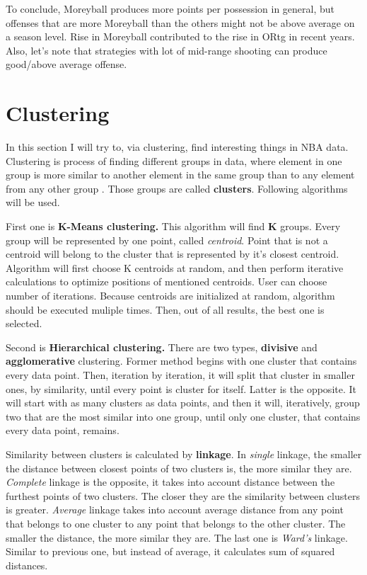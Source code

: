 \documentclass[a4paper]{article}
\begin{document}
To conclude, Moreyball produces more points per possession in general, but offenses that are more Moreyball than the others might not be above average on a season level. Rise in Moreyball contributed to the rise in ORtg in recent years. Also, let's note that strategies with lot of mid-range shooting can produce good/above average offense. %


\section{Clustering}
\label{sec:clustering}

In this section I will try to, via clustering, find interesting things in NBA data. Clustering is process of finding different groups in data, where element in one group is more similar to another element in the same group than to any element from any other group \cite{clustering}. Those groups are called \textbf{clusters}. Following algorithms will be used.

First one is \textbf{K-Means clustering.} This algorithm will find \textbf{K} groups. Every group will be represented by one point, called \textit{centroid}. Point that is not a centroid will belong to the cluster that is represented by it's closest centroid. Algorithm will first choose K centroids at random, and then perform iterative calculations to optimize positions of mentioned centroids. User can choose number of iterations. Because centroids are initialized at random, algorithm should be executed muliple times. Then, out of all results, the best one is selected. \cite{clustering}

Second is \textbf{Hierarchical clustering.} There are two types, \textbf{divisive} and \textbf{agglomerative} clustering. Former method begins with one cluster that contains every data point. Then, iteration by iteration, it will split that cluster in smaller ones, by similarity, until every point is cluster for itself. Latter is the opposite. It will start with as many clusters as data points, and then it will, iteratively, group two that are the most similar into one group, until only one cluster, that contains every data point, remains. \cite{clustering}

Similarity between clusters is calculated by \textbf{linkage}. In \textit{single} linkage, the smaller the distance between closest points of two clusters is, the more similar they are. \textit{Complete} linkage is the opposite, it takes into account distance between the furthest points of two clusters. The closer they are the similarity between clusters is greater. \textit{Average} linkage takes into account average distance from any point that belongs to one cluster to any point that belongs to the other cluster. The smaller the distance, the more similar they are. The last one is \textit{Ward's} linkage. Similar to previous one, but instead of average, it calculates sum of squared distances. \cite{clustering}\cite{hierarchical}
\end{document}
